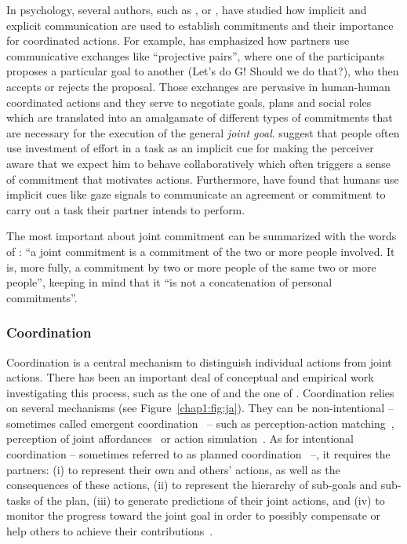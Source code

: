 \documentclass[a4paper,11pt,twoside]{StyleThese}
\begin{document}
In psychology, several authors, such as \cite{clark_2006_social}, \cite{michael2016} or \cite{siposova_2018_communicative}, have studied how implicit and explicit communication are used to establish commitments and their importance for coordinated actions. For example, \cite{clark_2006_social} has emphasized how partners use communicative exchanges like ``projective pairs'', where one of the participants proposes a particular goal to another (Let’s do G! Should we do that?), who then accepts or rejects the proposal. Those exchanges are pervasive in human-human coordinated actions and they serve to negotiate goals, plans and social roles which are translated into an amalgamate of different types of commitments that are necessary for the execution of the general \emph{joint goal}. \cite{michael2016} suggest that people often use investment of effort in a task as an implicit cue for making the perceiver aware that we expect him to behave collaboratively which often triggers a sense of commitment that motivates actions. Furthermore, \cite{siposova_2018_communicative} have found that humans use implicit cues like gaze signals to communicate an agreement or commitment to carry out a task their partner intends to perform.

The most important about joint commitment can be summarized with the words of \citet[p.~7]{gilbert_2013_joint}: ``a joint commitment is a commitment of the two or more people involved. It is, more fully, a commitment by two or more people of the same two or more people'', keeping in mind that it ``is not a concatenation of personal commitments''. 

\subsubsection{Coordination}
Coordination is a central mechanism to distinguish individual actions from joint actions. There has been an important deal of conceptual and empirical work investigating this process, such as the one of \cite{knoblich_2011_joint} and the one of \cite{pacherie_2012_agency}. Coordination relies on several mechanisms (see Figure~\ref{chap1:fig:ja}). They can be non-intentional -- sometimes called emergent coordination~\citep{knoblich_2011_joint} -- such as perception-action matching~\citep{brass_2001_movement}, perception of joint affordances~\citep{ramenzoni_2008_short} or action simulation~\citep{sebanz_2009_prediction}. As for intentional coordination – sometimes referred to as planned coordination~\citep{knoblich_2011_joint} –, it requires the partners: (i) to represent their own and others' actions, as well as the consequences of these actions, (ii) to represent the hierarchy of sub-goals and sub-tasks of the plan, (iii) to generate predictions of their joint actions, and (iv) to monitor the progress toward the joint goal in order to possibly compensate or help others to achieve their contributions~\citep{pacherie_2012_agency}. 
\end{document}

